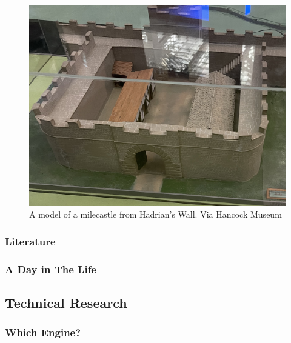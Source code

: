 \documentclass[sigconf,authordraft]{acmart}
\begin{document}
\begin{figure}[h]
  \includegraphics[width=0.8\linewidth]{milecastle.jpg}
  \caption{\label{fig:milecastle}A model of a milecastle from Hadrian's Wall.
  Via Hancock Museum}
\end{figure}


\subsubsection{Literature}

\subsubsection{A Day in The Life}

\subsection{Technical Research}

\subsubsection{Which Engine?}
\end{document}
